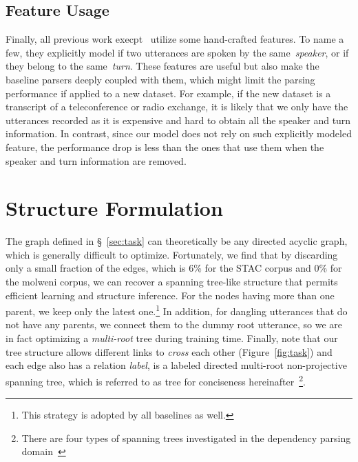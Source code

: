 \documentclass[11pt]{article}
\begin{document}
\subsection{Feature Usage}
\label{sec:feature}
Finally, all previous work execpt~\cite{liu-chen-2021-improving} utilize some hand-crafted features. To name a few, they explicitly model if two utterances are spoken by the same~\emph{speaker}, or if they belong to the same~\emph{turn}. These features are useful but also make the baseline parsers deeply coupled with them, which might limit the parsing performance if applied to a new dataset. For example, if the new dataset is a transcript of a teleconference or radio exchange, it is likely that we only have the utterances recorded as it is expensive and hard to obtain all the speaker and turn information. In contrast, since our model does not rely on such explicitly modeled feature, the performance drop is less than the ones that use them when the speaker and turn information are removed.

\section{Structure Formulation}
\label{sec:structure}
The graph  defined in \S~\ref{sec:task} can theoretically be any directed acyclic graph, which is generally difficult to optimize. Fortunately, we find that by discarding only a small fraction of the edges, which is 6\% for the STAC corpus and 0\% for the molweni corpus, we can recover a spanning tree-like structure that permits efficient learning and structure inference.
For the nodes having more than one parent, we keep only the latest one.\footnote{This strategy is adopted by all baselines as well.} In addition, for dangling utterances that do not have any parents, we connect them to the dummy root utterance, so we are in fact optimizing a \emph{multi-root} tree during training time. Finally, note that our tree structure allows different links to \emph{cross} each other (Figure~\ref{fig:task}) and each edge also has a relation \emph{label},  is a labeled directed multi-root non-projective spanning tree, which is referred to as tree for conciseness hereinafter~\footnote{There are four types of spanning trees investigated in the dependency parsing domain~\cite{mcdonald2005non,koo2007structured}}.
\end{document}
